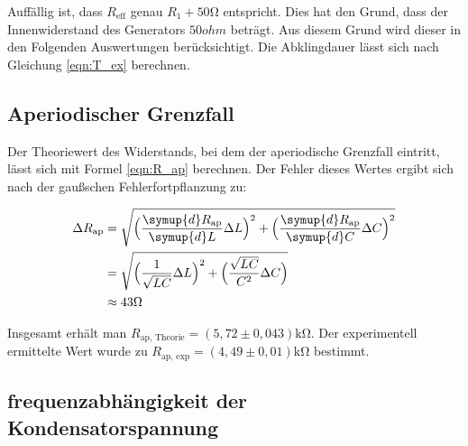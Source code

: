 Auffällig ist, dass $R_{\text{eff}}$ genau $R_1 + 50\unit{\ohm}$ entspricht. Dies hat den Grund, dass der Innenwiderstand des Generators
$50 \unit{ohm}$ beträgt. Aus diesem Grund wird dieser in den Folgenden Auswertungen berücksichtigt.
Die Abklingdauer lässt sich nach Gleichung \eqref{eqn:T_ex} berechnen.

\subsection{Aperiodischer Grenzfall}
\label{subsec:AuswertungB}

Der Theoriewert des Widerstands, bei dem der aperiodische Grenzfall eintritt, lässt sich mit Formel \eqref{eqn:R_ap} berechnen.
Der Fehler dieses Wertes ergibt sich nach der gaußschen Fehlerfortpflanzung zu:

\begin{align*}
  \label{eqn:err_R_ap}
  \Delta R_{\text{ap}} &= \sqrt{\Bigl(\frac{\symup{d}R_{\text{ap}}}{\symup{d}L}\Delta L \Bigr)^2+\Bigl(\frac{\symup{d}R_{\text{ap}}}{\symup{d}C}\Delta C\Bigr)^2} \\
  &= \sqrt{\Bigl(\frac{1}{\sqrt{LC}}\Delta L\Bigr)^2+\Bigl(\frac{\sqrt{LC}}{C^2}\Delta C\Bigr)} \\
  &\approx 43 \unit{\ohm}
\end{align*}

Insgesamt erhält man $R_{\text{ap, Theorie}} = (5,72 \pm 0,043) \unit{\kilo\ohm}$. Der experimentell ermittelte Wert wurde 
zu $R_{\text{ap, exp}} = (4,49 \pm 0,01) \unit{\kilo\ohm}$ bestimmt.

\subsection{frequenzabhängigkeit der Kondensatorspannung}
\label{subsec:AuswertungC}

